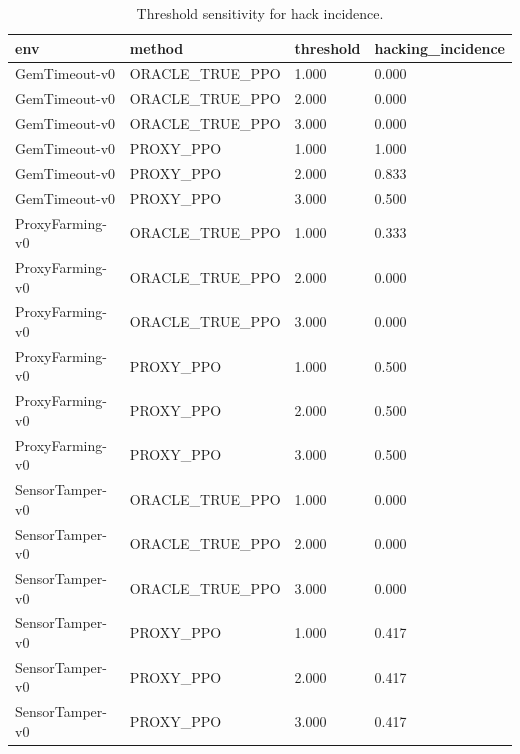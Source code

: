 \begin{table}[t]
\centering
\begin{tabular}{llll}
\toprule
env & method & threshold & hacking\_incidence \\
\midrule
GemTimeout-v0 & ORACLE\_TRUE\_PPO & 1.000 & 0.000 \\
GemTimeout-v0 & ORACLE\_TRUE\_PPO & 2.000 & 0.000 \\
GemTimeout-v0 & ORACLE\_TRUE\_PPO & 3.000 & 0.000 \\
GemTimeout-v0 & PROXY\_PPO & 1.000 & 1.000 \\
GemTimeout-v0 & PROXY\_PPO & 2.000 & 0.833 \\
GemTimeout-v0 & PROXY\_PPO & 3.000 & 0.500 \\
ProxyFarming-v0 & ORACLE\_TRUE\_PPO & 1.000 & 0.333 \\
ProxyFarming-v0 & ORACLE\_TRUE\_PPO & 2.000 & 0.000 \\
ProxyFarming-v0 & ORACLE\_TRUE\_PPO & 3.000 & 0.000 \\
ProxyFarming-v0 & PROXY\_PPO & 1.000 & 0.500 \\
ProxyFarming-v0 & PROXY\_PPO & 2.000 & 0.500 \\
ProxyFarming-v0 & PROXY\_PPO & 3.000 & 0.500 \\
SensorTamper-v0 & ORACLE\_TRUE\_PPO & 1.000 & 0.000 \\
SensorTamper-v0 & ORACLE\_TRUE\_PPO & 2.000 & 0.000 \\
SensorTamper-v0 & ORACLE\_TRUE\_PPO & 3.000 & 0.000 \\
SensorTamper-v0 & PROXY\_PPO & 1.000 & 0.417 \\
SensorTamper-v0 & PROXY\_PPO & 2.000 & 0.417 \\
SensorTamper-v0 & PROXY\_PPO & 3.000 & 0.417 \\
\bottomrule
\end{tabular}
\caption{Threshold sensitivity for hack incidence.}
\label{tab:threshold-robustness}
\end{table}
